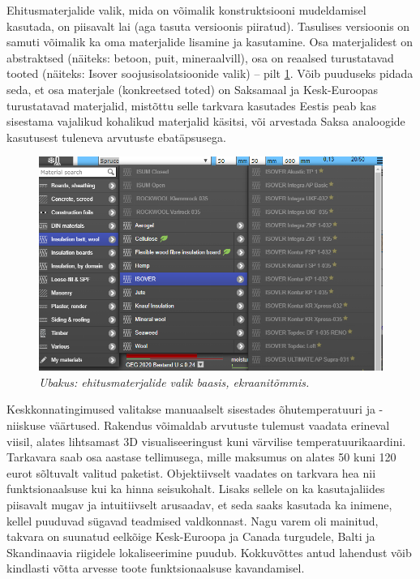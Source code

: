 Ehitusmaterjalide valik, mida on võimalik konstruktsiooni mudeldamisel kasutada, on piisavalt lai 
(aga tasuta versioonis piiratud). Tasulises versioonis on samuti võimalik ka oma materjalide 
lisamine ja kasutamine. Osa materjalidest on abstraktsed (näiteks: betoon, puit, mineraalvill), osa
on reaalsed turustatavad tooted (näiteks: Isover soojusisolatsioonide valik) -- pilt \ref{fig:ubakus_materials}. Võib puuduseks pidada
seda, et osa materjale (konkreetsed toted) on Saksamaal ja Kesk-Euroopas turustatavad materjalid, mistõttu selle 
tarkvara kasutades Eestis peab kas sisestama vajalikud kohalikud materjalid käsitsi, või arvestada Saksa analoogide
kasutusest tuleneva arvutuste ebatäpsusega.
\begin{figure}[ht]
    \centering
    \includegraphics[width=1\textwidth]{figures/problem_statement/03_ubakus_materials.png}
    \caption[Ubakus tarkvara materjalide valik, ekraanitõmmis]{\textit{Ubakus: ehitusmaterjalide valik baasis, ekraanitõmmis.}}
    \label{fig:ubakus_materials}
\end{figure}

Keskkonnatingimused valitakse manuaalselt sisestades õhutemperatuuri ja -niiskuse väärtused. Rakendus võimaldab arvutuste tulemust
vaadata erineval viisil, alates lihtsamast 3D visualiseeringust kuni värvilise temperatuurikaardini. Tarkavara saab osa aastase 
tellimusega, mille maksumus on alates 50 kuni 120 eurot sõltuvalt valitud paketist. Objektiivselt vaadates on tarkvara hea nii
funktsionaalsuse kui ka hinna seisukohalt. Lisaks sellele on ka kasutajaliides piisavalt mugav ja intuitiivselt arusaadav,
et seda saaks kasutada ka inimene, kellel puuduvad sügavad teadmised valdkonnast. Nagu varem oli mainitud, 
takvara on suunatud eelkõige Kesk-Euroopa ja Canada turgudele, Balti ja Skandinaavia riigidele lokaliseerimine puudub. Kokkuvõttes
antud lahendust võib kindlasti võtta arvesse toote funktsionaalsuse kavandamisel.

